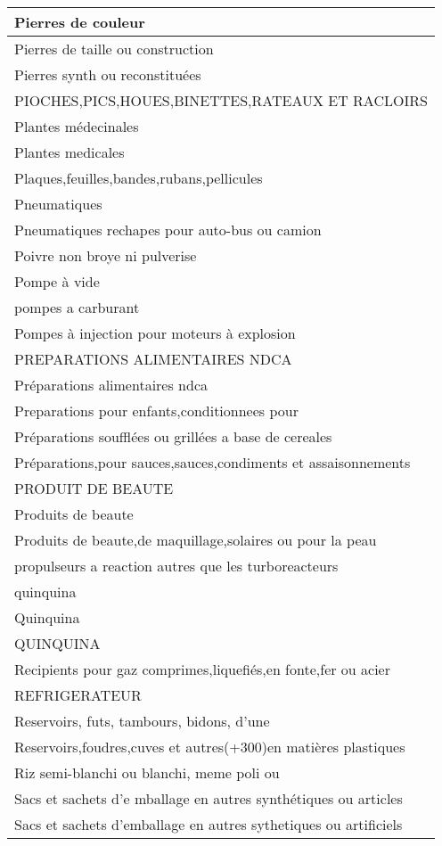 \documentclass[
]{book}
\begin{document}
\begin{table}
\begin{tabular}[t]{l}
Pierres de couleur\\
\hline
Pierres de taille ou construction\\
\hline
Pierres synth ou reconstituées\\
\hline
PIOCHES,PICS,HOUES,BINETTES,RATEAUX ET RACLOIRS\\
\hline
Plantes médecinales\\
\hline
Plantes medicales\\
\hline
Plaques,feuilles,bandes,rubans,pellicules\\
\hline
Pneumatiques\\
\hline
Pneumatiques rechapes pour auto-bus ou camion\\
\hline
Poivre non broye ni pulverise\\
\hline
Pompe à vide\\
\hline
pompes a carburant\\
\hline
Pompes à injection pour moteurs à explosion\\
\hline
PREPARATIONS ALIMENTAIRES NDCA\\
\hline
Préparations alimentaires ndca\\
\hline
Preparations pour enfants,conditionnees pour\\
\hline
Préparations soufflées ou grillées a base de cereales\\
\hline
Préparations,pour sauces,sauces,condiments et assaisonnements\\
\hline
PRODUIT DE BEAUTE\\
\hline
Produits de beaute\\
\hline
Produits de beaute,de maquillage,solaires ou pour la peau\\
\hline
propulseurs a reaction autres que les turboreacteurs\\
\hline
quinquina\\
\hline
Quinquina\\
\hline
QUINQUINA\\
\hline
Recipients pour gaz comprimes,liquefiés,en fonte,fer ou acier\\
\hline
REFRIGERATEUR\\
\hline
Reservoirs, futs, tambours, bidons, d'une\\
\hline
Reservoirs,foudres,cuves et autres(+300)en matières plastiques\\
\hline
Riz semi-blanchi ou blanchi, meme poli ou\\
\hline
Sacs et sachets d'e mballage en autres synthétiques ou articles\\
\hline
Sacs et sachets d'emballage en autres sythetiques ou artificiels\\

\end{tabular}
\end{table}
\end{document}
